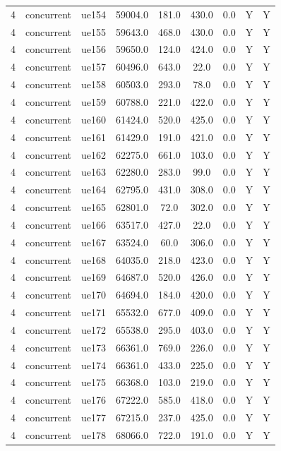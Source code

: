 \begin{table}[ht]
\begin{tabular}{|c|c|c|c|c|c|c|c|c|}
4 & concurrent & ue154 & 59004.0 & 181.0 & 430.0 & 0.0 & Y & Y \\
4 & concurrent & ue155 & 59643.0 & 468.0 & 430.0 & 0.0 & Y & Y \\
4 & concurrent & ue156 & 59650.0 & 124.0 & 424.0 & 0.0 & Y & Y \\
4 & concurrent & ue157 & 60496.0 & 643.0 & 22.0 & 0.0 & Y & Y \\
4 & concurrent & ue158 & 60503.0 & 293.0 & 78.0 & 0.0 & Y & Y \\
4 & concurrent & ue159 & 60788.0 & 221.0 & 422.0 & 0.0 & Y & Y \\
4 & concurrent & ue160 & 61424.0 & 520.0 & 425.0 & 0.0 & Y & Y \\
4 & concurrent & ue161 & 61429.0 & 191.0 & 421.0 & 0.0 & Y & Y \\
4 & concurrent & ue162 & 62275.0 & 661.0 & 103.0 & 0.0 & Y & Y \\
4 & concurrent & ue163 & 62280.0 & 283.0 & 99.0 & 0.0 & Y & Y \\
4 & concurrent & ue164 & 62795.0 & 431.0 & 308.0 & 0.0 & Y & Y \\
4 & concurrent & ue165 & 62801.0 & 72.0 & 302.0 & 0.0 & Y & Y \\
4 & concurrent & ue166 & 63517.0 & 427.0 & 22.0 & 0.0 & Y & Y \\
4 & concurrent & ue167 & 63524.0 & 60.0 & 306.0 & 0.0 & Y & Y \\
4 & concurrent & ue168 & 64035.0 & 218.0 & 423.0 & 0.0 & Y & Y \\
4 & concurrent & ue169 & 64687.0 & 520.0 & 426.0 & 0.0 & Y & Y \\
4 & concurrent & ue170 & 64694.0 & 184.0 & 420.0 & 0.0 & Y & Y \\
4 & concurrent & ue171 & 65532.0 & 677.0 & 409.0 & 0.0 & Y & Y \\
4 & concurrent & ue172 & 65538.0 & 295.0 & 403.0 & 0.0 & Y & Y \\
4 & concurrent & ue173 & 66361.0 & 769.0 & 226.0 & 0.0 & Y & Y \\
4 & concurrent & ue174 & 66361.0 & 433.0 & 225.0 & 0.0 & Y & Y \\
4 & concurrent & ue175 & 66368.0 & 103.0 & 219.0 & 0.0 & Y & Y \\
4 & concurrent & ue176 & 67222.0 & 585.0 & 418.0 & 0.0 & Y & Y \\
4 & concurrent & ue177 & 67215.0 & 237.0 & 425.0 & 0.0 & Y & Y \\
4 & concurrent & ue178 & 68066.0 & 722.0 & 191.0 & 0.0 & Y & Y \\

\end{tabular}
\end{table}
